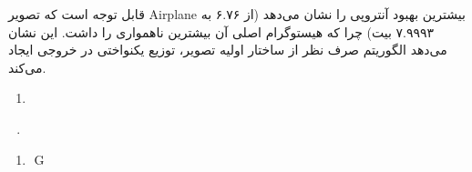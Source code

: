 قابل توجه است که تصویر Airplane بیشترین بهبود آنتروپی را نشان می‌دهد (از ۶.۷۶ به ۷.۹۹۹۳ بیت) چرا که هیستوگرام اصلی آن بیشترین ناهمواری را داشت. این نشان می‌دهد الگوریتم صرف نظر از ساختار اولیه تصویر، توزیع یکنواختی در خروجی ایجاد می‌کند.

\begin{enumerate}
\def\labelenumi{\arabic{enumi}.}
\setcounter{enumi}{5}
\item
  \protect{}\label{_Toc232899918}{}  ‌ 
\end{enumerate}

  ‌              ‌                      .

\begin{enumerate}
\def\labelenumi{\arabic{enumi}.}
\item
  \protect{}\label{_Toc232899950}{}  ‌      G\RL{)}
\end{enumerate}

